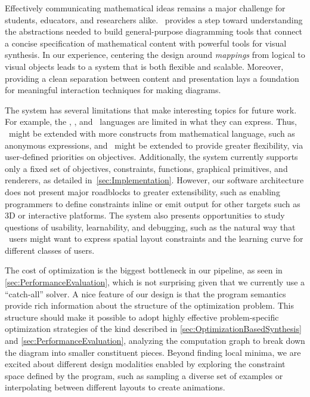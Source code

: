 Effectively communicating mathematical ideas remains a major challenge for students, educators, and researchers alike. \Penrose\ provides a step toward understanding the abstractions needed to build general-purpose diagramming tools that connect a concise specification of mathematical content with powerful tools for visual synthesis.  In our experience, centering the design around \emph{mappings} from logical to visual objects leads to a system that is both flexible and scalable.  Moreover, providing a clean separation between content and presentation lays a foundation for meaningful interaction techniques for making diagrams.

The system has several limitations that make interesting topics for future work. For example, the \Domain, \Substance, and \Style\ languages are limited in what they can express. Thus, \Substance\ might be extended with more constructs from mathematical language, such as anonymous expressions, and \Style\ might be extended to provide greater flexibility, \eg{} via user-defined priorities on objectives. Additionally, the system currently supports only a fixed set of objectives, constraints, functions, graphical primitives, and renderers, as detailed in~\cref{sec:Implementation}. However, our software architecture does not present major roadblocks to greater extensibility, such as enabling programmers to define constraints inline or emit output for other targets such as 3D or interactive platforms. The system also presents opportunities to study questions of usability, learnability, and debugging, such as the natural way that \Style\ users might want to express spatial layout constraints and the learning curve for different classes of users. 

The cost of optimization is the biggest bottleneck in our pipeline, as seen in \cref{sec:PerformanceEvaluation}, which is not surprising given that we currently use a ``catch-all'' solver.  A nice feature of our design is that the program semantics provide rich information about the structure of the optimization problem.  This structure should make it possible to adopt highly effective problem-specific optimization strategies of the kind described in \cref{sec:OptimizationBasedSynthesis} and \cref{sec:PerformanceEvaluation}, \eg{} analyzing the computation graph to break down the diagram into smaller constituent pieces.  Beyond finding local minima, we are excited about different design modalities enabled by exploring the constraint space defined by the \Style{} program, such as sampling a diverse set of examples or interpolating between different layouts to create animations.

